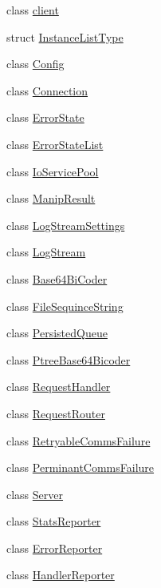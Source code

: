 \begin{DoxyCompactItemize}
\item 
class \hyperlink{classkisscpp_1_1client}{client}
\item 
struct \hyperlink{structkisscpp_1_1_instance_list_type}{Instance\-List\-Type}
\item 
class \hyperlink{classkisscpp_1_1_config}{Config}
\item 
class \hyperlink{classkisscpp_1_1_connection}{Connection}
\item 
class \hyperlink{classkisscpp_1_1_error_state}{Error\-State}
\item 
class \hyperlink{classkisscpp_1_1_error_state_list}{Error\-State\-List}
\item 
class \hyperlink{classkisscpp_1_1_io_service_pool}{Io\-Service\-Pool}
\item 
class \hyperlink{classkisscpp_1_1_manip_result}{Manip\-Result}
\item 
class \hyperlink{classkisscpp_1_1_log_stream_settings}{Log\-Stream\-Settings}
\item 
class \hyperlink{classkisscpp_1_1_log_stream}{Log\-Stream}
\item 
class \hyperlink{classkisscpp_1_1_base64_bi_coder}{Base64\-Bi\-Coder}
\item 
class \hyperlink{classkisscpp_1_1_file_sequince_string}{File\-Sequince\-String}
\item 
class \hyperlink{classkisscpp_1_1_persisted_queue}{Persisted\-Queue}
\item 
class \hyperlink{classkisscpp_1_1_ptree_base64_bicoder}{Ptree\-Base64\-Bicoder}
\item 
class \hyperlink{classkisscpp_1_1_request_handler}{Request\-Handler}
\item 
class \hyperlink{classkisscpp_1_1_request_router}{Request\-Router}
\item 
class \hyperlink{classkisscpp_1_1_retryable_comms_failure}{Retryable\-Comms\-Failure}
\item 
class \hyperlink{classkisscpp_1_1_perminant_comms_failure}{Perminant\-Comms\-Failure}
\item 
class \hyperlink{classkisscpp_1_1_server}{Server}
\item 
class \hyperlink{classkisscpp_1_1_stats_reporter}{Stats\-Reporter}
\item 
class \hyperlink{classkisscpp_1_1_error_reporter}{Error\-Reporter}
\item 
class \hyperlink{classkisscpp_1_1_handler_reporter}{Handler\-Reporter}

\end{DoxyCompactItemize}
